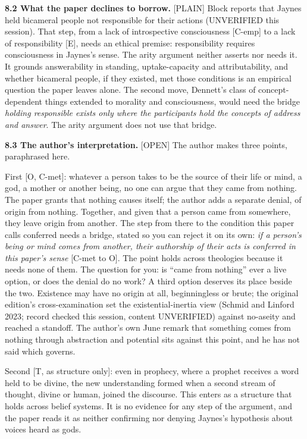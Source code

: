 \documentclass[11pt]{article}
\newcommand{\register}[1]{{\ttfamily\small #1}}
\begin{document}
\textbf{8.2 What the paper declines to borrow.} \register{[PLAIN]} Block reports that Jaynes held bicameral people not responsible for their actions (UNVERIFIED this session). That step, from a lack of introspective consciousness [C-emp] to a lack of responsibility [E], needs an ethical premise: responsibility requires consciousness in Jaynes's sense. The arity argument neither asserts nor needs it. It grounds answerability in standing, uptake-capacity and attributability, and whether bicameral people, if they existed, met those conditions is an empirical question the paper leaves alone. The second move, Dennett's class of concept-dependent things extended to morality and consciousness, would need the bridge \emph{holding responsible exists only where the participants hold the concepts of address and answer}. The arity argument does not use that bridge.

\textbf{8.3 The author's interpretation.} \register{[OPEN]} The author makes three points, paraphrased here.

First [O, C-met]: whatever a person takes to be the source of their life or mind, a god, a mother or another being, no one can argue that they came from nothing. The paper grants that nothing causes itself; the author adds a separate denial, of origin from nothing. Together, and given that a person came from somewhere, they leave origin from another. The step from there to the condition this paper calls conferred needs a bridge, stated so you can reject it on its own: \emph{if a person's being or mind comes from another, their authorship of their acts is conferred in this paper's sense} [C-met to O]. The point holds across theologies because it needs none of them. The question for you: is ``came from nothing'' ever a live option, or does the denial do no work? A third option deserves its place beside the two. Existence may have no origin at all, beginningless or brute; the original edition's cross-examination set the existential-inertia view (Schmid and Linford 2023; record checked this session, content UNVERIFIED) against no-aseity and reached a standoff. The author's own June remark that something comes from nothing through abstraction and potential sits against this point, and he has not said which governs.

Second [T, as structure only]: even in prophecy, where a prophet receives a word held to be divine, the new understanding formed when a second stream of thought, divine or human, joined the discourse. This enters as a structure that holds across belief systems. It is no evidence for any step of the argument, and the paper reads it as neither confirming nor denying Jaynes's hypothesis about voices heard as gods.
\end{document}

